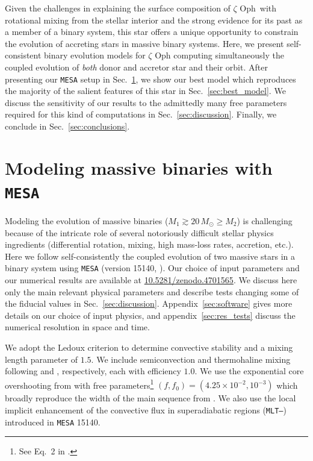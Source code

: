 \documentclass[twocolumn,twocolappendix,trackchanges]{aastex63}
\DeclareRobustCommand{\Secref}[1]{Sec.~\ref{#1}}
\newcommand{\zoph}{$\zeta$ Oph}
\begin{document}
Given the challenges in explaining the surface composition of \zoph\
with rotational mixing from the stellar interior and the strong
evidence for its past as a member of a binary system, this star offers
a unique opportunity to constrain the evolution of accreting stars in
massive binary systems. Here, we present self-consistent binary evolution models for
$\zeta$ Oph computing simultaneously the coupled evolution of
\emph{both} donor and accretor star and their orbit. After presenting
our \texttt{MESA} setup in \Secref{sec:methods}, we show our best model which
reproduces the majority of the salient features of this star in
\Secref{sec:best_model}. %
We discuss the
sensitivity of our results to the admittedly many free parameters
required for this kind of computations in
\Secref{sec:discussion}. Finally, we conclude in
\Secref{sec:conclusions}.



\section{Modeling massive binaries with \texttt{MESA}}
\label{sec:methods}

Modeling the evolution of massive binaries
($M_1\gtrsim 20\,M_\odot \geq M_2$) is challenging because of the
intricate role of several notoriously difficult stellar physics
ingredients (differential rotation, mixing, high mass-loss rates,
accretion, etc.). Here we follow self-consistently the coupled
evolution of two massive stars in a binary system using \texttt{MESA}
(version 15140, \citealt{paxton:11, paxton:13, paxton:15, paxton:18, paxton:19}). Our choice of input parameters and our numerical
results are available at \url{10.5281/zenodo.4701565}. We discuss here only the main
relevant physical parameters and describe tests changing some of the
fiducial values in \Secref{sec:discussion}. Appendix~\ref{sec:software} gives
more details on our choice of input physics, and
appendix~\ref{sec:res_tests} discuss the numerical resolution in space and time.

We adopt the Ledoux criterion to determine convective stability and a
mixing length parameter of $1.5$. We include semiconvection and
thermohaline mixing following \cite{langer:83} and
\cite{kippenhahn:80}, respectively, each with efficiency $1.0$. We use the exponential core overshooting from \cite{herwig:00}
with free parameters\footnote{See Eq.~2 in \cite{paxton:11}.} $(f, f_0)=(4.25\times10^{-2}, 10^{-3})$
\citep{claret:17} which broadly reproduce the width of the main
sequence from \cite{brott:11}. We also use the local implicit
enhancement of the convective flux in superadiabatic regions
(\texttt{MLT--}) introduced in \texttt{MESA}
15140.
\end{document}
